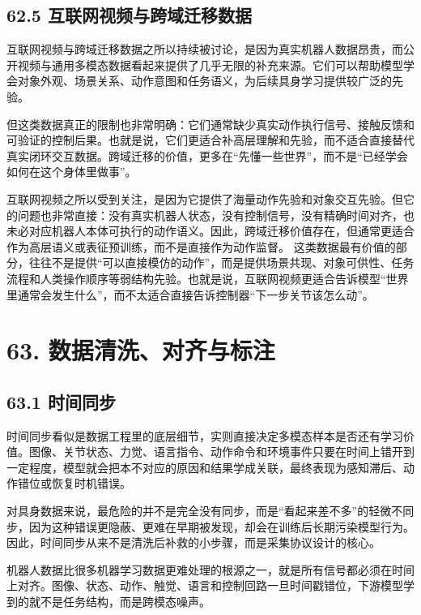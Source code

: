 \subsection*{62.5 互联网视频与跨域迁移数据}


互联网视频与跨域迁移数据之所以持续被讨论，是因为真实机器人数据昂贵，而公开视频与通用多模态数据看起来提供了几乎无限的补充来源。它们可以帮助模型学会对象外观、场景关系、动作意图和任务语义，为后续具身学习提供较广泛的先验。

但这类数据真正的限制也非常明确：它们通常缺少真实动作执行信号、接触反馈和可验证的控制后果。也就是说，它们更适合补高层理解和先验，而不适合直接替代真实闭环交互数据。跨域迁移的价值，更多在“先懂一些世界”，而不是“已经学会如何在这个身体里做事”。

互联网视频之所以受到关注，是因为它提供了海量动作先验和对象交互先验。但它的问题也非常直接：没有真实机器人状态，没有控制信号，没有精确时间对齐，也未必对应机器人本体可执行的动作语义。因此，跨域迁移价值存在，但通常更适合作为高层语义或表征预训练，而不是直接作为动作监督。 这类数据最有价值的部分，往往不是提供“可以直接模仿的动作”，而是提供场景共现、对象可供性、任务流程和人类操作顺序等弱结构先验。也就是说，互联网视频更适合告诉模型“世界里通常会发生什么”，而不太适合直接告诉控制器“下一步关节该怎么动”。

\section*{63. 数据清洗、对齐与标注}

\subsection*{63.1 时间同步}


时间同步看似是数据工程里的底层细节，实则直接决定多模态样本是否还有学习价值。图像、关节状态、力觉、语言指令、动作命令和环境事件只要在时间上错开到一定程度，模型就会把本不对应的原因和结果学成关联，最终表现为感知滞后、动作错位或恢复时机错误。

对具身数据来说，最危险的并不是完全没有同步，而是“看起来差不多”的轻微不同步，因为这种错误更隐蔽、更难在早期被发现，却会在训练后长期污染模型行为。因此，时间同步从来不是清洗后补救的小步骤，而是采集协议设计的核心。

机器人数据比很多机器学习数据更难处理的根源之一，就是所有信号都必须在时间上对齐。图像、状态、动作、触觉、语言和控制回路一旦时间戳错位，下游模型学到的就不是任务结构，而是跨模态噪声。


